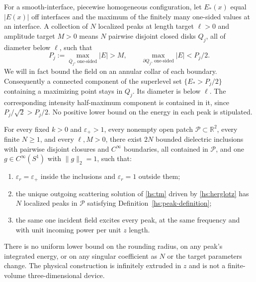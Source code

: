 \begin{definition}
\label{hs:peak-definition}
For a smooth-interface, piecewise homogeneous configuration, let
$E_*(x)$ equal $|E(x)|$ off interfaces and the maximum of the finitely
many one-sided values at an interface.  A collection of $N$
localized peaks at length target $\ell>0$ and amplitude target $M>0$
means $N$ pairwise disjoint closed disks $Q_j$, all of diameter below
$\ell$, such that
\begin{equation}
 P_j:=\max_{\overline Q_j,\,\text{one-sided}}|E|>M,
 \qquad
 \max_{\partial Q_j,\,\text{one-sided}}|E|<P_j/2.
 \label{hs:peak-test}
\end{equation}
We will in fact bound the field on an annular collar of each boundary.
Consequently a connected component of the superlevel set
$\{E_*>P_j/2\}$ containing a maximizing point stays in $Q_j$.
Its diameter is below $\ell$.  The corresponding intensity half-maximum
component is contained in it, since $P_j/\sqrt2>P_j/2$.
No positive lower bound on the energy in each peak is stipulated.
\end{definition}

\begin{theorem}
\label{hs:packing}
For every fixed $k>0$ and $\varepsilon_+>1$, every nonempty open
patch $\mathcal P\subset\mathbb R^2$, every finite $N\geq1$, and every
$\ell,M>0$, there exist $2N$ bounded dielectric inclusions with pairwise
disjoint closures and $C^\infty$ boundaries, all contained in
$\mathcal P$, and one $g\in C^\infty(S^1)$ with $\|g\|_2=1$, such that:
\begin{enumerate}
 \item $\varepsilon_r=\varepsilon_+$ inside the inclusions and
       $\varepsilon_r=1$ outside them;
 \item the unique outgoing scattering solution of \eqref{hs:tm}
       driven by \eqref{hs:herglotz} has $N$ localized peaks in
       $\mathcal P$ satisfying Definition~\ref{hs:peak-definition};
 \item the same one incident field excites every peak, at the same
       frequency and with unit incoming power per unit $z$ length.
\end{enumerate}
There is no uniform lower bound on the rounding radius, on any peak's
integrated energy, or on any singular coefficient as $N$ or the target
parameters change.  The physical construction is infinitely extruded
in $z$ and is not a finite-volume three-dimensional device.
\end{theorem}


